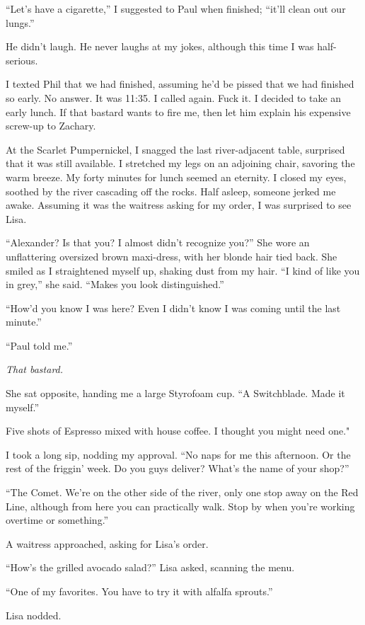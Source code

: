 ``Let's have a cigarette,'' I suggested to Paul when finished; ``it'll
clean out our lungs.''

He didn't laugh. He never laughs at my jokes, although this time I was
half-serious.

I texted Phil that we had finished, assuming he'd be pissed that we had
finished so early. No answer. It was 11:35. I called again. Fuck it. I
decided to take an early lunch. If that bastard wants to fire me, then
let him explain his expensive screw-up to Zachary.

At the Scarlet Pumpernickel, I snagged the last river-adjacent table,
surprised that it was still available. I stretched my legs on an
adjoining chair, savoring the warm breeze. My forty minutes for lunch
seemed an eternity. I closed my eyes, soothed by the river cascading off
the rocks. Half asleep, someone jerked me awake. Assuming it was the
waitress asking for my order, I was surprised to see Lisa.

``Alexander? Is that you? I almost didn't recognize you?'' She wore an
unflattering oversized brown maxi-dress, with her blonde hair tied back.
She smiled as I straightened myself up, shaking dust from my hair. ``I
kind of like you in grey,'' she said. ``Makes you look distinguished.''

``How'd you know I was here? Even I didn't know I was coming until the
last minute.''

``Paul told me.''

\emph{That bastard.}

She sat opposite, handing me a large Styrofoam cup. ``A Switchblade.
Made it myself.''

Five shots of Espresso mixed with house coffee. I thought you might need
one."

I took a long sip, nodding my approval. ``No naps for me this afternoon.
Or the rest of the friggin' week. Do you guys deliver? What's the name
of your shop?''

``The Comet. We're on the other side of the river, only one stop away on
the Red Line, although from here you can practically walk. Stop by when
you're working overtime or something.''

A waitress approached, asking for Lisa's order.

``How's the grilled avocado salad?'' Lisa asked, scanning the menu.

``One of my favorites. You have to try it with alfalfa sprouts.''

Lisa nodded.

